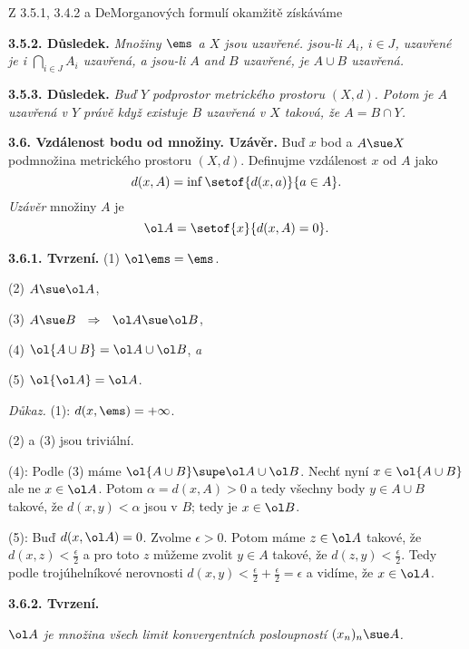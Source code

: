 \documentclass[12pt]{article}
\begin{document}
{   \medskip 
   
   Z 3.5.1, 3.4.2 a DeMorganových formulí okamžitě získáváme
   
   \medskip
   
  {\bf 3.5.2. Důsledek.} {\em Množiny $\ems$ a $X$ jsou uzavřené. jsou-li $A_i$, $i\in J$, uzavřené je i $\bigcap_{i\in J}A_i$ uzavřená, a jsou-li $A$ and $B$ uzavřené, je $A\cup B$ uzavřená.}
  
  \medskip
  
  {\bf 3.5.3. Důsledek.} {\em Buď $Y$ podprostor metrického prostoru $(X,d)$. Potom je $A$ uzavřená v $Y$ právě když existuje $B$ uzavřená v $X$ taková, že $A=B\cap Y$.}
  
  
  
  \bigskip
  
  {\bf 3.6. Vzdálenost bodu od množiny. Uzávěr.} Buď $x$ bod a $A\sue X$ podmnožina metrického prostoru $(X,d)$.  Definujme vzdálenost $x$ od $A$ jako
  $$
  d(x,A)=\inf\setof{d(x,a)}{a\in A}.
  $$
  {\em Uzávěr} množiny $A$ je
  $$
  \ol A=\setof{x}{d(x,A)=0}.
  $$
  
  \medskip
  
  {\bf 3.6.1. Tvrzení.} (1) $\ol\ems=\ems$.
  
  \hskip40mm (2) $A\sue \ol A$,
  
  \hskip40mm (3) $A\sue B\ \ \Rightarrow\ \ \ol A\sue\ol B$,
  
  \hskip40mm (4) $\ol{A\cup B}=\ol A\cup\ol B$, {\em a}
  
  \hskip40mm (5) $\ol{\ol A}= \ol A$.
  
  {\em Důkaz.} (1): $d(x,\ems)=+\infty$.
  
  (2) a (3) jsou triviální.
  
  (4): Podle (3) máme $\ol{A\cup B}\supe \ol A\cup\ol B$. Nechť nyní $x\in\ol{A\cup B}$ ale ne $x\in\ol A$. Potom $\alpha=d(x,A)>0$ a tedy všechny body $y\in A\cup B$ takové, že $d(x,y)<\alpha$ jsou v  $B$; tedy je $x\in \ol B$.
  
  (5): Buď $d(x,\ol A)=0$. Zvolme $\epsilon>0$. Potom  máme $z\in \ol A$ takové, že $d(x,z)<\frac{\epsilon}{2}$
  a pro toto $z$ můžeme zvolit $y\in A$ takové, že $d(z,y)<\frac{\epsilon}{2}$. Tedy podle trojúhelníkové nerovnosti
  $d(x,y)<\frac{\epsilon}{2}+\frac{\epsilon}{2}=\epsilon$ a vidíme, že $x\in\ol A$. \sq
  
  \medskip
  
  {\bf 3.6.2. Tvrzení.} {\em $\ol A$ je množina všech limit konvergentních posloupností  $(x_n)_n\sue A$.
  
}}
\end{document}
